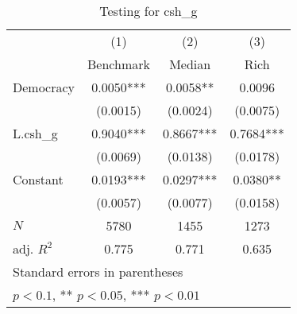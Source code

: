\begin{table}[htbp]\centering
\def\sym#1{\ifmmode^{#1}\else\(^{#1}\)\fi}
\caption{Testing for csh\_g \label{tab:regression3}}
\begin{tabular}{l*{3}{c}}
\hline\hline
            &\multicolumn{1}{c}{(1)}&\multicolumn{1}{c}{(2)}&\multicolumn{1}{c}{(3)}\\
            &\multicolumn{1}{c}{Benchmark}&\multicolumn{1}{c}{Median}&\multicolumn{1}{c}{Rich}\\
\hline
Democracy   &      0.0050***&      0.0058** &      0.0096   \\
            &    (0.0015)   &    (0.0024)   &    (0.0075)   \\
[1em]
L.csh\_g     &      0.9040***&      0.8667***&      0.7684***\\
            &    (0.0069)   &    (0.0138)   &    (0.0178)   \\
[1em]
Constant    &      0.0193***&      0.0297***&      0.0380** \\
            &    (0.0057)   &    (0.0077)   &    (0.0158)   \\
\hline
\(N\)       &        5780   &        1455   &        1273   \\
adj. \(R^{2}\)&       0.775   &       0.771   &       0.635   \\
\hline\hline
\multicolumn{4}{l}{\footnotesize Standard errors in parentheses}\\
\multicolumn{4}{l}{\footnotesize * \(p<0.1\), ** \(p<0.05\), *** \(p<0.01\)}\\
\end{tabular}
\end{table}
